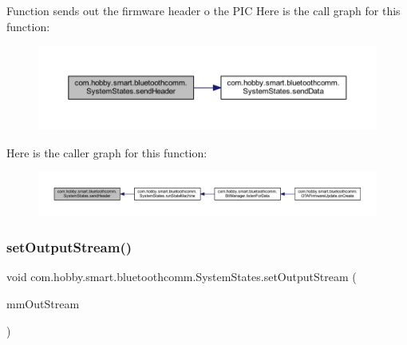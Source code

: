 Function sends out the firmware header o the P\+IC Here is the call graph for this function\+:\nopagebreak
\begin{figure}[H]
\begin{center}
\leavevmode
\includegraphics[width=350pt]{classcom_1_1hobby_1_1smart_1_1bluetoothcomm_1_1_system_states_ad7e78c660a16bba26735f2e2bb68599a_cgraph}
\end{center}
\end{figure}
Here is the caller graph for this function\+:\nopagebreak
\begin{figure}[H]
\begin{center}
\leavevmode
\includegraphics[width=350pt]{classcom_1_1hobby_1_1smart_1_1bluetoothcomm_1_1_system_states_ad7e78c660a16bba26735f2e2bb68599a_icgraph}
\end{center}
\end{figure}
\mbox{\label{classcom_1_1hobby_1_1smart_1_1bluetoothcomm_1_1_system_states_a05d853946c36a52b5400482b2b66584a}} 
\subsubsection{\texorpdfstring{set\+Output\+Stream()}{setOutputStream()}}
{\footnotesize\ttfamily void com.\+hobby.\+smart.\+bluetoothcomm.\+System\+States.\+set\+Output\+Stream (\begin{DoxyParamCaption}\item[{Output\+Stream}]{mm\+Out\+Stream }\end{DoxyParamCaption})}

